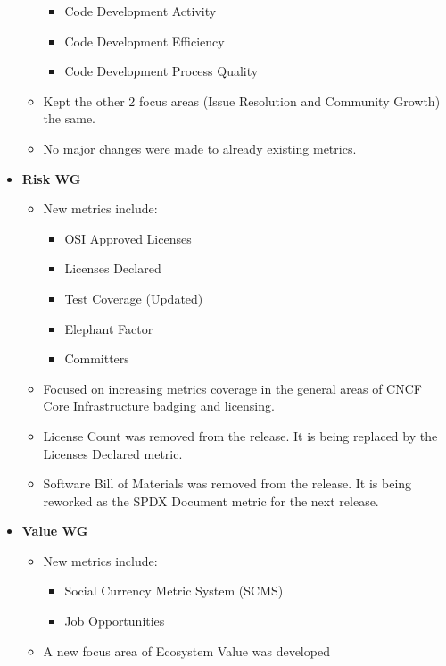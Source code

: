 \begin{itemize}
\begin{itemize}
    \begin{itemize}
    \tightlist
    \item
      Code Development Activity
    \item
      Code Development Efficiency
    \item
      Code Development Process Quality
    \end{itemize}
  \item
    Kept the other 2 focus areas (Issue Resolution and Community Growth)
    the same.
  \item
    No major changes were made to already existing metrics.
  \end{itemize}
\item
  \textbf{Risk WG}

  \begin{itemize}
  \tightlist
  \item
    New metrics include:

    \begin{itemize}
    \tightlist
    \item
      OSI Approved Licenses
    \item
      Licenses Declared
    \item
      Test Coverage (Updated)
    \item
      Elephant Factor
    \item
      Committers
    \end{itemize}
  \item
    Focused on increasing metrics coverage in the general areas of CNCF
    Core Infrastructure badging and licensing.
  \item
    License Count was removed from the release. It is being replaced by
    the Licenses Declared metric.
  \item
    Software Bill of Materials was removed from the release. It is being
    reworked as the SPDX Document metric for the next release.
  \end{itemize}
\item
  \textbf{Value WG}

  \begin{itemize}
  \tightlist
  \item
    New metrics include:

    \begin{itemize}
    \tightlist
    \item
      Social Currency Metric System (SCMS)
    \item
      Job Opportunities
    \end{itemize}
  \item
    A new focus area of Ecosystem Value was developed
  \end{itemize}
\end{itemize}


